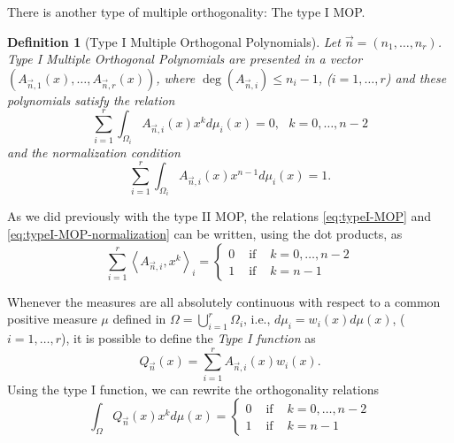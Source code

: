 \documentclass[12pt,a4]{article}
\theoremstyle{plain}
\newtheorem{definition}[theorem]{Definition}
\newcommand{\prodesc}[2]{\left\langle #1 , #2 \right\rangle}
\begin{document}
There is another type of multiple orthogonality: The type I MOP.

\begin{definition}[Type I Multiple Orthogonal Polynomials]
    \label{def:typeI-univar}
    Let $\vec n = (n_1,\dots,n_r)$. Type I Multiple Orthogonal Polynomials are presented in a vector $(A_{\vec n, 1}(x), \dots, A_{\vec n, r}(x))$, where $\deg(A_{\vec n, i})\leq n_i-1$, ($i=1,\dots,r$) and these polynomials satisfy the relation
    \begin{equation}
        \label{eq:typeI-MOP}
        \sum_{i=1}^r \int_{\Omega_i}A_{\vec n, i}(x) x^k d\mu_i(x) = 0,  \ \ \ k=0,\dots,n-2
    \end{equation}
    and the normalization condition
    \begin{equation}
        \label{eq:typeI-MOP-normalization}
        \sum_{i=1}^r \int_{\Omega_i}A_{\vec n, i}(x) x^{n-1} d\mu_i(x) = 1.
    \end{equation}
    
\end{definition}

As we did previously with the type II MOP, the relations \eqref{eq:typeI-MOP} and \eqref{eq:typeI-MOP-normalization} can be written, using the dot products, as
\begin{equation}
    \sum_{i=1}^r \prodesc{A_{\vec n,i}}{x^k}_i = \left\{\begin{array}{ccl}
        0 &   \text{ if } & k=0,\dots,n-2 \\
        1 & \text{ if } & k=n-1      
    \end{array}\right.
\end{equation}

Whenever the measures are all absolutely continuous with respect to a common positive measure $\mu$ defined in $\Omega = \displaystyle\bigcup_{i=1}^r \Omega_i$, i.e., $d\mu_i = w_i(x) d\mu(x)$, ($i=1,\dots,r$), it is possible to define the \textit{Type I function} as
\begin{equation}
    \label{eq:typeI-function}
    Q_{\vec n}(x)=\sum_{i=1}^r A_{\vec n,i}(x)w_i(x).
\end{equation}
Using the type I function, we can rewrite the orthogonality relations
\begin{equation}
    \label{eq:typeI-MOP-dot}
    \int_\Omega Q_{\vec n}(x) x^k d\mu(x) = \left\{\begin{array}{ccl}
        0 &   \text{ if } & k=0,\dots,n-2 \\
        1 & \text{ if } & k=n-1      
    \end{array}\right.
\end{equation}
\end{document}

